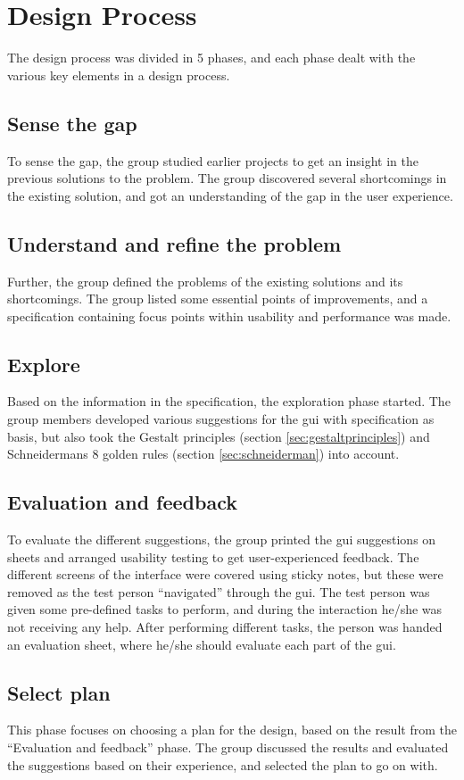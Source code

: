 \section{Design Process}
\label{sec:hcimethod}
The design process was divided in 5 phases, and each phase dealt with the various key elements in a design process.

\subsection{Sense the gap}
\label{sec:sensethegap}
To sense the gap, the group studied earlier projects to get an insight in the previous solutions to the problem. The group discovered several shortcomings in the existing solution, and got an understanding of the gap in the user experience.

\subsection{Understand and refine the problem}
Further, the group defined the problems of the existing solutions and its shortcomings. The group listed some essential points of improvements, and a specification containing focus points within usability and performance was made.

\subsection{Explore}
\label{sec:explore}
Based on the information in the specification, the exploration phase started. The group members developed various suggestions for the \acrshort{gui} with specification as basis, but also took the Gestalt principles (section \ref{sec:gestaltprinciples}) and Schneidermans 8 golden rules (section \ref{sec:schneiderman}) into account.

\subsection{Evaluation and feedback}
\label{sec:evalandfeedback}
To evaluate the different suggestions, the group printed the \acrshort{gui} suggestions on sheets and arranged usability testing to get user-experienced feedback. The different screens of the interface were covered using sticky notes, but these were removed as the test person ``navigated'' through the \acrshort{gui}. The test person was given some pre-defined tasks to perform, and during the interaction he/she was not receiving any help. After performing different tasks, the person was handed an evaluation sheet, where he/she should evaluate each part of the \acrshort{gui}.

\subsection{Select plan}
\label{sec:selectplan}
This phase focuses on choosing a plan for the design, based on the result from the ``Evaluation and feedback'' phase. The group discussed the results and evaluated the suggestions based on their experience, and selected the plan to go on with.